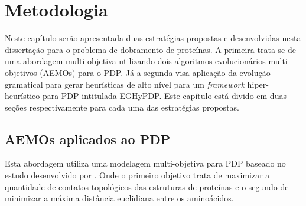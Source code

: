 \chapter{Metodologia}
\label{cap:Metodologia}

Neste capítulo serão apresentada duas estratégias propostas e desenvolvidas nesta dissertação para o problema de dobramento de proteínas. A primeira trata-se de uma abordagem multi-objetiva utilizando dois algoritmos evolucionários multi-objetivos (AEMOs) para o PDP. Já a segunda visa aplicação da evolução gramatical  para gerar heurísticas de alto nível para um \textit{framework} hiper-heurístico  para PDP intitulada EGHyPDP. Este capítulo está divido em duas seções respectivamente para cada uma das estratégias propostas.

\section{AEMOs aplicados ao PDP}

Esta abordagem utiliza uma modelagem multi-objetiva para PDP baseado no estudo desenvolvido por \cite{gabriel2012algoritmos}. Onde o primeiro objetivo trata de maximizar a quantidade de contatos topológicos das estruturas de proteínas e o segundo de minimizar a máxima distância euclidiana entre os aminoácidos. 



